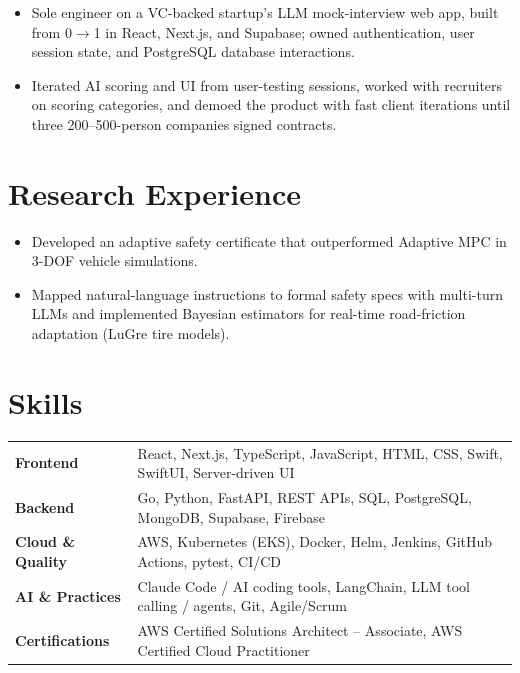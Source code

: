 \documentclass[11pt, letterpaper]{article}
\begin{document}
\begin{itemize}
  \item Sole engineer on a VC-backed startup's LLM mock-interview web app, built from 0$\to$1 in React, Next.js, and Supabase; owned authentication, user session state, and PostgreSQL database interactions.
  \item Iterated AI scoring and UI from user-testing sessions, worked with recruiters on scoring categories, and demoed the product with fast client iterations until three 200--500-person companies signed contracts.
\end{itemize}

\section{Research Experience}
\begin{itemize}
  \item Developed an adaptive safety certificate that outperformed Adaptive MPC in 3-DOF vehicle simulations.
  \item Mapped natural-language instructions to formal safety specs with multi-turn LLMs and implemented Bayesian estimators for real-time road-friction adaptation (LuGre tire models).
\end{itemize}

\section{Skills}
\begin{tabularx}{\textwidth}{@{}l @{\hspace{7pt}} >{\raggedright\arraybackslash}X@{}}
  \textbf{Frontend} & React, Next.js, TypeScript, JavaScript, HTML, CSS, Swift, SwiftUI, Server-driven UI \\[1pt]
  \textbf{Backend} & Go, Python, FastAPI, REST APIs, SQL, PostgreSQL, MongoDB, Supabase, Firebase \\[1pt]
  \textbf{Cloud \& Quality} & AWS, Kubernetes (EKS), Docker, Helm, Jenkins, GitHub Actions, pytest, CI/CD \\[1pt]
  \textbf{AI \& Practices} & Claude Code / AI coding tools, LangChain, LLM tool calling / agents, Git, Agile/Scrum \\[1pt]
  \textbf{Certifications} & AWS Certified Solutions Architect -- Associate, AWS Certified Cloud Practitioner \\
\end{tabularx}
\end{document}
